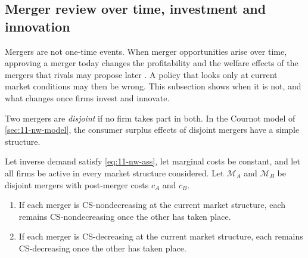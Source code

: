 \subsection{Merger review over time, investment and innovation}\label{sec:11-dynamics}

Mergers are not one-time events. When merger opportunities arise over time, approving a merger today changes the
profitability and the welfare effects of the mergers that rivals may propose later \citep[p.~232]{AskerNocke2021}. A
policy that looks only at current market conditions may then be wrong. This subsection shows when it is not, and what
changes once firms invest and innovate.

Two mergers are \emph{disjoint} if no firm takes part in both. In the Cournot model of \cref{sec:11-nw-model}, the
consumer surplus effects of disjoint mergers have a simple structure.

\begin{proposition}\label{prop:11-signpreserve}
Let inverse demand satisfy \eqref{eq:11-nw-ass}, let marginal costs be constant, and let all firms be active in every
market structure considered. Let $\mathcal{M}_A$ and $\mathcal{M}_B$ be disjoint mergers with post-merger costs
$c_A$ and $c_B$.
\begin{enumerate}[label=(\roman*)]
\item If each merger is CS-nondecreasing at the current market structure, each remains CS-nondecreasing once the other
has taken place.
\item If each merger is CS-decreasing at the current market structure, each remains CS-decreasing once the other has
taken place.
\end{enumerate}
\end{proposition}

